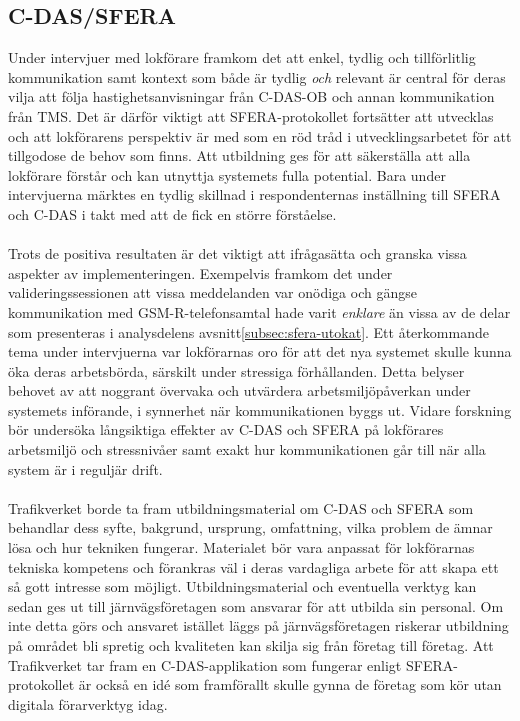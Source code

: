 \subsection{C-DAS/SFERA\@}
Under intervjuer med lokförare framkom det att enkel, tydlig och tillförlitlig kommunikation samt kontext som både är tydlig \emph{och} relevant är central för deras vilja att följa hastighetsanvisningar från C-DAS-OB och annan kommunikation från TMS\@.
Det är därför viktigt att SFERA-protokollet fortsätter att utvecklas och att lokförarens perspektiv är med som en röd tråd i utvecklingsarbetet för att tillgodose de behov som finns.
Att utbildning ges för att säkerställa att alla lokförare förstår och kan utnyttja systemets fulla potential.
Bara under intervjuerna märktes en tydlig skillnad i respondenternas inställning till SFERA och C-DAS i takt med att de fick en större förståelse.
\paragraph{}
\hspace{-13pt}
Trots de positiva resultaten är det viktigt att ifrågasätta och granska vissa aspekter av implementeringen.
Exempelvis framkom det under valideringssessionen att vissa meddelanden var onödiga och gängse kommunikation med GSM-R-telefonsamtal hade varit \emph{enklare} än vissa av de delar som presenteras i analysdelens avsnitt\ref{subsec:sfera-utokat}.
Ett återkommande tema under intervjuerna var lokförarnas oro för att det nya systemet skulle kunna öka deras arbetsbörda, särskilt under stressiga förhållanden.
Detta belyser behovet av att noggrant övervaka och utvärdera arbetsmiljöpåverkan under systemets införande, i synnerhet när kommunikationen byggs ut.
Vidare forskning bör undersöka långsiktiga effekter av C-DAS och SFERA på lokförares arbetsmiljö och stressnivåer samt exakt hur kommunikationen går till när alla system är i reguljär drift.
\paragraph{}
\hspace{-14pt}
Trafikverket borde ta fram utbildningsmaterial om C-DAS och SFERA som behandlar dess syfte, bakgrund, ursprung, omfattning, vilka problem de ämnar lösa och hur tekniken fungerar.
Materialet bör vara anpassat för lokförarnas tekniska kompetens och förankras väl i deras vardagliga arbete för att skapa ett så gott intresse som möjligt.
Utbildningsmaterial och eventuella verktyg kan sedan ges ut till järnvägsföretagen som ansvarar för att utbilda sin personal.
Om inte detta görs och ansvaret istället läggs på järnvägsföretagen riskerar utbildning på området bli spretig och kvaliteten kan skilja sig från företag till företag.
Att Trafikverket tar fram en C-DAS-applikation som fungerar enligt SFERA-protokollet är också en idé som framförallt skulle gynna de företag som kör utan digitala förarverktyg idag.
